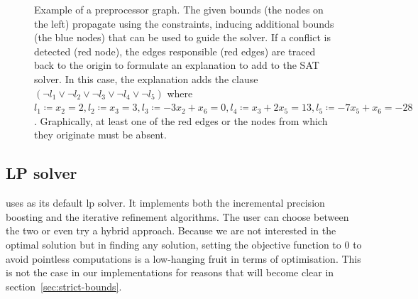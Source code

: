 \documentclass[runningheads]{llncs}
\begin{document}
\begin{figure}[h]
    \caption{Example of a preprocessor graph. The given bounds (the nodes on the left) propagate using the constraints, inducing additional bounds (the blue nodes) that can be used to guide the solver.
        If a conflict is detected (red node), the edges responsible (red edges) are traced back to the origin to formulate an explanation to add to the SAT solver.
        In this case, the explanation adds the clause $(\neg l_1 \lor \neg l_2 \lor \neg l_3 \lor \neg l_4 \lor \neg l_5)$ where $l_1 \coloneqq x_2 = 2, l_2 \coloneqq x_3 = 3, l_3 \coloneqq -3x_2 + x_6 = 0, l_4 \coloneqq x_3 + 2x_5 = 13, l_5 \coloneqq -7x_5 + x_6 = -28$.
        Graphically, at least one of the red edges or the nodes from which they originate must be absent.}
    \label{dg:preprocessor}
\end{figure}

\subsection{LP solver}

\dlinear uses \soplex as its default \gls{lp} solver.
It implements both the incremental precision boosting and the iterative refinement algorithms.
The user can choose between the two or even try a hybrid approach.
Because we are not interested in the optimal solution but in finding any solution, setting the objective function to $0$ to avoid pointless computations is a low-hanging fruit in terms of optimisation.
This is not the case in our implementations for reasons that will become clear in section~\ref{sec:strict-bounds}.
\end{document}

